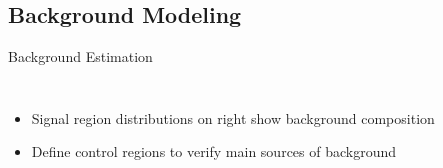 \documentclass[aspectratio=169,xcolor=table]{beamer}
\begin{document}
  \subsection{ Background Modeling }
    \begin{frame}[t]{Background Estimation}
      \begin{columns}[t]
        \vspace{-3.5cm}
          \begin{itemize}
            \item Signal region \Etm distributions on right show background composition
            \item Define control regions to verify main sources of background
          \end{itemize}



\end{columns}
\end{frame}
\end{document}
